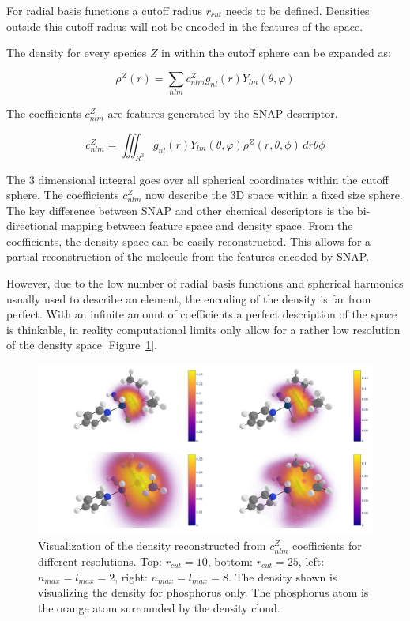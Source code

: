 For radial basis functions a cutoff radius $r_{cut}$ needs to be defined.
Densities outside this cutoff radius will not be encoded in the features of the space.

The density for every species $Z$ in within the cutoff sphere can be expanded as:

$$ \rho^Z(r) = \sum_{nlm} c^Z_{nlm} g_{nl}(r) Y_{lm}(\theta, \varphi) $$

The coefficients $c_{nlm}^Z$ are features generated by the SNAP descriptor.

$$ c_{nlm}^Z = \iiint_{R^3} g_{nl}(r) Y_{lm}(\theta, \varphi) \rho^Z(r, \theta, \phi)  \,dr\theta\phi   $$

The 3 dimensional integral goes over all spherical coordinates within the cutoff sphere.
The coefficients $c^Z_{nlm}$ now describe the 3D space within a fixed size sphere.
\\
The key difference between SNAP and other chemical descriptors is the bi-directional mapping between feature space and 
density space.
From the coefficients, the density space can be easily reconstructed.
This allows for a partial reconstruction of the molecule from the features encoded by SNAP.

However, due to the low number of radial basis functions and spherical harmonics usually used to describe an element, 
the encoding of the density is far from perfect.
With an infinite amount of coefficients a perfect description of the space is thinkable,
in reality computational limits only allow for a rather low resolution of the density space [Figure~\ref{fig:snap-density}]. 
\begin{figure} [h]
  \centering
  \includegraphics[width=1\textwidth]{figures/snap/density/dense.png} %
  \caption[SNAP density visualization]{Visualization of the density reconstructed from $c_{nlm}^Z$ coefficients for different resolutions.
  Top: $r_{cut} = 10$, bottom: $r_{cut} = 25$, left: $n_{max} = l_{max} = 2$, right: $n_{max} = l_{max} = 8$.
  The density shown is visualizing the density for phosphorus only.
  The phosphorus atom is the orange atom surrounded by the density cloud.
  }
  \label{fig:snap-density}
\end{figure}

